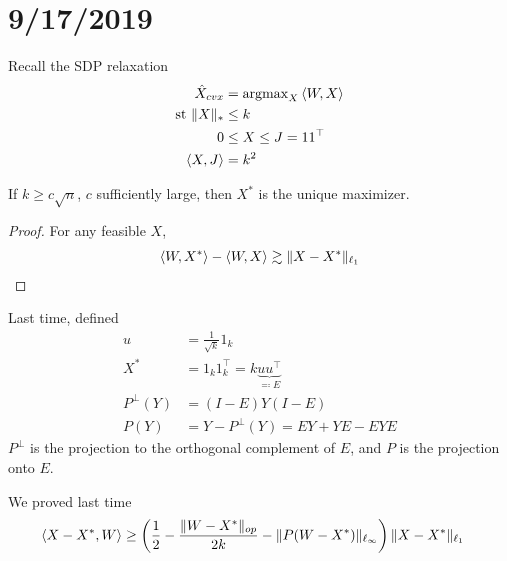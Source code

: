\section{9/17/2019}

Recall the SDP relaxation
\begin{align}
  \hat{X}_{cvx} &= \operatorname{argmax}_X \braket{W, X} \\
  \text{st } \|X\|_\ast &\leq k \\
  0 &\leq X \leq J = 1 1^\top \\
  \braket{X,J} &= k^2
\end{align}

\begin{theorem}
  If $k \geq c \sqrt{n}$, $c$ sufficiently large,
  then $X^*$ is the unique maximizer.
\end{theorem}

\begin{proof}
  For any feasible $X$,
  \begin{align}
    \braket{W, X^*} - \braket{W, X} \gtrsim \|X - X^*\|_{\ell_1}
  \end{align}
\end{proof}

Last time, defined
\begin{align}
  u &= \frac{1}{\sqrt{k}} 1_k \\
  X^* &= 1_k 1_k^\top = k \underbrace{u u^\top}_{\eqqcolon E} \\
  P^\perp(Y) &= (I - E)Y(I - E) \\
  P(Y) &= Y - P^\perp(Y) = E Y + Y E - E Y E
\end{align}
$P^\perp$ is the projection to the orthogonal complement of $E$,
and $P$ is the projection onto $E$.

We proved last time
\begin{align}
  \braket{X - X^*, W}
  &\geq \left(\frac{1}{2} - \frac{\|W - X^*\|_{op}}{2k} - \|P(W - X^*)\|_{\ell_\infty} \right)\|X - X^*\|_{\ell_1}
\end{align}

